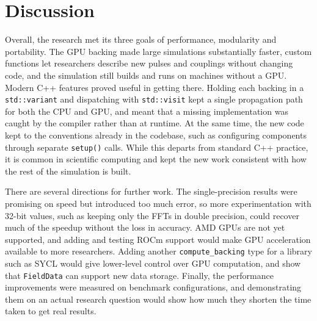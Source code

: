 \chapter{Discussion}

Overall, the research met its three goals of performance, modularity and portability. The GPU
backing made large simulations substantially faster, custom functions let researchers describe new
pulses and couplings without changing code, and the simulation still builds and runs on machines
without a GPU. Modern C++ features proved useful in getting there. Holding each backing in a
\texttt{std::variant} and dispatching with \texttt{std::visit} kept a single propagation path for both
the CPU and GPU, and meant that a missing implementation was caught by the compiler rather than at
runtime. At the same time, the new code kept to the conventions already in the codebase, such as
configuring components through separate \texttt{setup()} calls. While this departs from standard C++
practice, it is common in scientific computing and kept the new work consistent with how the rest of
the simulation is built.

There are several directions for further work. The single-precision results were promising on speed
but introduced too much error, so more experimentation with 32-bit values, such as keeping only the
FFTs in double precision, could recover much of the speedup without the loss in accuracy. AMD GPUs
are not yet supported, and adding and testing ROCm support would make GPU acceleration available to
more researchers. Adding another \texttt{compute\_backing} type for a library such as SYCL
would give lower-level control over GPU computation, and show that \texttt{FieldData} can support new
data storage.
Finally, the performance improvements were measured on benchmark configurations, and demonstrating them 
on an actual research question would show how much they shorten the time taken to get real results.
